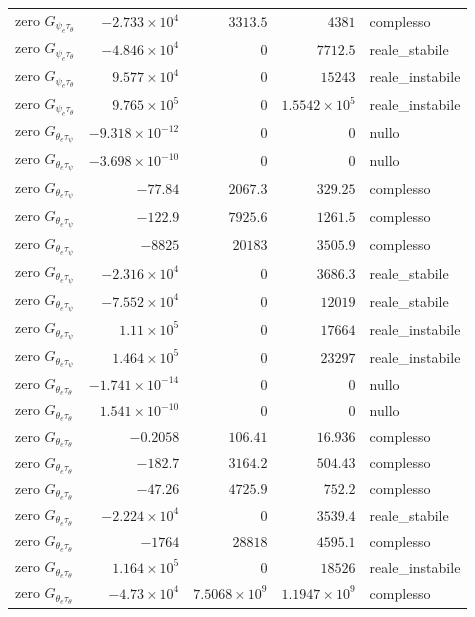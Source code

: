 \documentclass[10pt,a4paper]{article}
\numberwithin{equation}{section}
\begin{document}
\begin{longtable}{lrrrl}
zero $G_{\psi_e\tau_\theta}$ & $-2.733\times10^{4}$ & $3313.5$ & $4381$ & complesso \\
zero $G_{\psi_e\tau_\theta}$ & $-4.846\times10^{4}$ & $0$ & $7712.5$ & reale\_stabile \\
zero $G_{\psi_e\tau_\theta}$ & $9.577\times10^{4}$ & $0$ & $15243$ & reale\_instabile \\
zero $G_{\psi_e\tau_\theta}$ & $9.765\times10^{5}$ & $0$ & $1.5542\times10^{5}$ & reale\_instabile \\
\midrule
zero $G_{\theta_e\tau_\psi}$ & $-9.318\times10^{-12}$ & $0$ & $0$ & nullo \\
zero $G_{\theta_e\tau_\psi}$ & $-3.698\times10^{-10}$ & $0$ & $0$ & nullo \\
zero $G_{\theta_e\tau_\psi}$ & $-77.84$ & $2067.3$ & $329.25$ & complesso \\
zero $G_{\theta_e\tau_\psi}$ & $-122.9$ & $7925.6$ & $1261.5$ & complesso \\
zero $G_{\theta_e\tau_\psi}$ & $-8825$ & $20183$ & $3505.9$ & complesso \\
zero $G_{\theta_e\tau_\psi}$ & $-2.316\times10^{4}$ & $0$ & $3686.3$ & reale\_stabile \\
zero $G_{\theta_e\tau_\psi}$ & $-7.552\times10^{4}$ & $0$ & $12019$ & reale\_stabile \\
zero $G_{\theta_e\tau_\psi}$ & $1.11\times10^{5}$ & $0$ & $17664$ & reale\_instabile \\
zero $G_{\theta_e\tau_\psi}$ & $1.464\times10^{5}$ & $0$ & $23297$ & reale\_instabile \\
\midrule
zero $G_{\theta_e\tau_\theta}$ & $-1.741\times10^{-14}$ & $0$ & $0$ & nullo \\
zero $G_{\theta_e\tau_\theta}$ & $1.541\times10^{-10}$ & $0$ & $0$ & nullo \\
zero $G_{\theta_e\tau_\theta}$ & $-0.2058$ & $106.41$ & $16.936$ & complesso \\
zero $G_{\theta_e\tau_\theta}$ & $-182.7$ & $3164.2$ & $504.43$ & complesso \\
zero $G_{\theta_e\tau_\theta}$ & $-47.26$ & $4725.9$ & $752.2$ & complesso \\
zero $G_{\theta_e\tau_\theta}$ & $-2.224\times10^{4}$ & $0$ & $3539.4$ & reale\_stabile \\
zero $G_{\theta_e\tau_\theta}$ & $-1764$ & $28818$ & $4595.1$ & complesso \\
zero $G_{\theta_e\tau_\theta}$ & $1.164\times10^{5}$ & $0$ & $18526$ & reale\_instabile \\
zero $G_{\theta_e\tau_\theta}$ & $-4.73\times10^{4}$ & $7.5068\times10^{9}$ & $1.1947\times10^{9}$ & complesso \\
\bottomrule\end{longtable}
\end{document}
